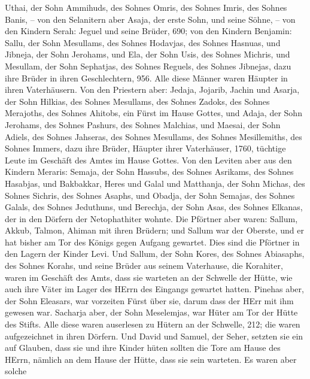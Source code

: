 Uthai, der Sohn Ammihuds, des Sohnes Omris, des Sohnes Imris, des Sohnes
Banis, --  von den Selanitern aber Asaja, der erste Sohn,
und seine Söhne, --  von den Kindern Serah: Jeguel und seine
Brüder, 690;  von den Kindern Benjamin: Sallu, der Sohn
Mesullams, des Sohnes Hodavjas, des Sohnes Hasnuas,  und
Jibneja, der Sohn Jerohams, und Ela, der Sohn Usis, des Sohnes Michris,
und Mesullam, der Sohn Sephatjas, des Sohnes Reguels, des Sohnes
Jibnejas,  dazu ihre Brüder in ihren Geschlechtern, 956.
Alle diese Männer waren Häupter in ihren Vaterhäusern.  Von
den Priestern aber: Jedaja, Jojarib, Jachin  und Asarja,
der Sohn Hilkias, des Sohnes Mesullams, des Sohnes Zadoks, des Sohnes
Merajoths, des Sohnes Ahitobs, ein Fürst im Hause Gottes, 
und Adaja, der Sohn Jerohams, des Sohnes Pashurs, des Sohnes Malchias,
und Maesai, der Sohn Adiels, des Sohnes Jahseras, des Sohnes Mesullams,
des Sohnes Mesillemiths, des Sohnes Immers,  dazu ihre
Brüder, Häupter ihrer Vaterhäuser, 1760, tüchtige Leute im Geschäft des
Amtes im Hause Gottes.  Von den Leviten aber aus den
Kindern Meraris: Semaja, der Sohn Hassubs, des Sohnes Asrikams, des
Sohnes Hasabjas,  und Bakbakkar, Heres und Galal und
Matthanja, der Sohn Michas, des Sohnes Sichris, des Sohnes Asaphs,
 und Obadja, der Sohn Semajas, des Sohnes Galals, des
Sohnes Jeduthuns, und Berechja, der Sohn Asas, des Sohnes Elkanas, der
in den Dörfern der Netophathiter wohnte.  Die Pförtner aber
waren: Sallum, Akkub, Talmon, Ahiman mit ihren Brüdern; und Sallum war
der Oberste,  und er hat bisher am Tor des Königs gegen
Aufgang gewartet. Dies sind die Pförtner in den Lagern der Kinder Levi.
 Und Sallum, der Sohn Kores, des Sohnes Abiasaphs, des
Sohnes Korahs, und seine Brüder aus seinem Vaterhause, die Korahiter,
waren im Geschäft des Amts, dass sie warteten an der Schwelle der Hütte,
wie auch ihre Väter im Lager des HErrn des Eingangs gewartet hatten.
 Pinehas aber, der Sohn Eleasars, war vorzeiten Fürst über
sie, darum dass der HErr mit ihm gewesen war.  Sacharja
aber, der Sohn Meselemjas, war Hüter am Tor der Hütte des Stifts.
 Alle diese waren auserlesen zu Hütern an der Schwelle,
212; die waren aufgezeichnet in ihren Dörfern. Und David und Samuel, der
Seher, setzten sie ein auf Glauben,  dass sie und ihre
Kinder hüten sollten die Tore am Hause des HErrn, nämlich an dem Hause
der Hütte, dass sie sein warteten.  Es waren aber solche
